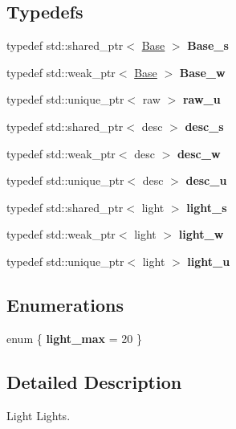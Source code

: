 \subsection*{Typedefs}
\begin{DoxyCompactItemize}
\item 
\hypertarget{namespaceNeb_1_1Light_a03237411d9ad123ad266cab98dabccc8}{typedef std\-::shared\-\_\-ptr$<$ \hyperlink{classNeb_1_1Light_1_1Base}{Base} $>$ {\bfseries Base\-\_\-s}}\label{namespaceNeb_1_1Light_a03237411d9ad123ad266cab98dabccc8}

\item 
\hypertarget{namespaceNeb_1_1Light_a0b33c3884229660efb4220e54b2a0834}{typedef std\-::weak\-\_\-ptr$<$ \hyperlink{classNeb_1_1Light_1_1Base}{Base} $>$ {\bfseries Base\-\_\-w}}\label{namespaceNeb_1_1Light_a0b33c3884229660efb4220e54b2a0834}

\item 
\hypertarget{namespaceNeb_1_1Light_a96dd3a67387acb31580743df8adc7616}{typedef std\-::unique\-\_\-ptr$<$ raw $>$ {\bfseries raw\-\_\-u}}\label{namespaceNeb_1_1Light_a96dd3a67387acb31580743df8adc7616}

\item 
\hypertarget{namespaceNeb_1_1Light_aca0e04131e2d48988c444e52c1c4c3a2}{typedef std\-::shared\-\_\-ptr$<$ desc $>$ {\bfseries desc\-\_\-s}}\label{namespaceNeb_1_1Light_aca0e04131e2d48988c444e52c1c4c3a2}

\item 
\hypertarget{namespaceNeb_1_1Light_ac253732ab1684bc58c57e6548884fc9e}{typedef std\-::weak\-\_\-ptr$<$ desc $>$ {\bfseries desc\-\_\-w}}\label{namespaceNeb_1_1Light_ac253732ab1684bc58c57e6548884fc9e}

\item 
\hypertarget{namespaceNeb_1_1Light_a6fd49b947c4cb831fbe664e88c28b8ad}{typedef std\-::unique\-\_\-ptr$<$ desc $>$ {\bfseries desc\-\_\-u}}\label{namespaceNeb_1_1Light_a6fd49b947c4cb831fbe664e88c28b8ad}

\item 
\hypertarget{namespaceNeb_1_1Light_ae52a2ee906ae0041ea94f58031e107ff}{typedef std\-::shared\-\_\-ptr$<$ light $>$ {\bfseries light\-\_\-s}}\label{namespaceNeb_1_1Light_ae52a2ee906ae0041ea94f58031e107ff}

\item 
\hypertarget{namespaceNeb_1_1Light_a3d27d8bc596c7032b12b8de173179608}{typedef std\-::weak\-\_\-ptr$<$ light $>$ {\bfseries light\-\_\-w}}\label{namespaceNeb_1_1Light_a3d27d8bc596c7032b12b8de173179608}

\item 
\hypertarget{namespaceNeb_1_1Light_a48e27b38f1a109eca8bb99deba0548d3}{typedef std\-::unique\-\_\-ptr$<$ light $>$ {\bfseries light\-\_\-u}}\label{namespaceNeb_1_1Light_a48e27b38f1a109eca8bb99deba0548d3}

\end{DoxyCompactItemize}
\subsection*{Enumerations}
\begin{DoxyCompactItemize}
\item 
enum \{ {\bfseries light\-\_\-max} = 20
 \}
\end{DoxyCompactItemize}


\subsection{Detailed Description}
Light Lights. 